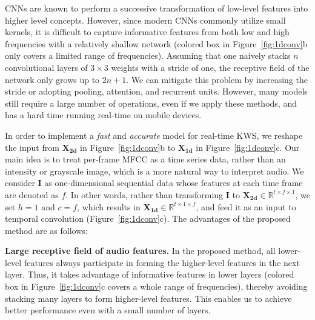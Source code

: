 \documentclass[a4paper]{article}
\begin{document}
CNNs are known to perform a successive transformation of low-level features into higher level concepts.
However, since modern CNNs commonly utilize small kernels, it is difficult to capture informative features from both low and high frequencies with a relatively shallow network (colored box in Figure~\ref{fig:1dconv}b only covers a limited range of frequencies).
Assuming that one naively stacks $n$ convolutional layers of $3 \times 3$ weights with a stride of one, the receptive field of the network only grows up to $2n + 1$.
We can mitigate this problem by increasing the stride or adopting pooling, attention, and recurrent units.
However, many models still require a large number of operations, even if we apply these methods, and has a hard time running real-time on mobile devices.

In order to implement a \emph{fast} and \emph{accurate} model for real-time KWS, we reshape the input from $\mathbf{X_{2d}}$ in Figure~\ref{fig:1dconv}b to $\mathbf{X_{1d}}$ in Figure~\ref{fig:1dconv}c.
Our main idea is to treat per-frame MFCC as a time series data, rather than an intensity or grayscale image, which is a more natural way to interpret audio.
We consider $\mathbf{I}$ as one-dimensional sequential data whose features at each time frame are denoted as $f$.
In other words, rather than transforming $\mathbf{I}$ to $\mathbf{X_{2d}} \in \mathbb{R}^{t \times f\times 1}$, we set $h = 1$ and $c = f$, which results in $\mathbf{X_{1d}} \in \mathbb{R}^{t \times 1\times f}$, and feed it as an input to temporal convolution (Figure~\ref{fig:1dconv}c). 
The advantages of the proposed method are as follows:

\textbf{Large receptive field of audio features.} 
In the proposed method, all lower-level features always participate in forming the higher-level features in the next layer.
Thus, it takes advantage of informative features in lower layers (colored box in Figure~\ref{fig:1dconv}c covers a whole range of frequencies), thereby avoiding stacking many layers to form higher-level features.
This enables us to achieve better performance even with a small number of layers.
\end{document}
